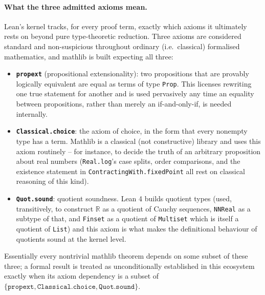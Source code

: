 \documentclass[11pt]{article}
\begin{document}
\paragraph{What the three admitted axioms mean.} Lean's kernel tracks, for
every proof term, exactly which axioms it ultimately rests on beyond pure
type-theoretic reduction. Three axioms are considered standard and
non-suspicious throughout ordinary (i.e.\ classical) formalised mathematics,
and mathlib is built expecting all three:
\begin{itemize}
\item \textbf{\texttt{propext}} (propositional extensionality): two
  propositions that are provably logically equivalent are equal as terms of
  type \texttt{Prop}. This licenses rewriting one true statement for another
  and is used pervasively any time an equality between propositions, rather
  than merely an if-and-only-if, is needed internally.
\item \textbf{\texttt{Classical.choice}}: the axiom of choice, in the form
  that every nonempty type has a term. Mathlib is a classical (not
  constructive) library and uses this axiom routinely -- for instance, to
  decide the truth of an arbitrary proposition about real numbers
  (\texttt{Real.log}'s case splits, order comparisons, and the existence
  statement in \texttt{ContractingWith.fixedPoint} all rest on classical
  reasoning of this kind).
\item \textbf{\texttt{Quot.sound}}: quotient soundness. Lean 4 builds
  quotient types (used, transitively, to construct $\mathbb{R}$ as a quotient
  of Cauchy sequences, \texttt{NNReal} as a subtype of that, and
  \texttt{Finset} as a quotient of \texttt{Multiset} which is itself a
  quotient of \texttt{List}) and this axiom is what makes the definitional
  behaviour of quotients sound at the kernel level.
\end{itemize}
Essentially every nontrivial mathlib theorem depends on some subset of these
three; a formal result is treated as unconditionally established in this
ecosystem exactly when its axiom dependency is a subset of
$\{\texttt{propext}, \texttt{Classical.choice}, \texttt{Quot.sound}\}$.
\end{document}
